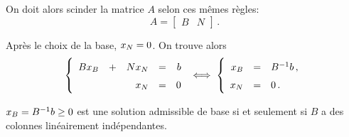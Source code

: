	On doit alors scinder la matrice $A$ selon ces mêmes règles:
	\[
	A
	=
	\begin{bmatrix}
		B & N
	\end{bmatrix}\,.
	\]

	Après le choix de la base, $x_N = 0$.
	On trouve alors
	\[
	\renewcommand{\arraystretch}{1.5}
	\left\{
	\begin{array}{rcrcr}
		B \xb & + & N \xn & = & b\\
		      &   &   \xn & = & 0
	\end{array}
	\right.
	\iff
	\left\{
	\begin{array}{rcl}
		\xb & = & B^{-1} b\,,\\
		\xn & = & 0\,.
	\end{array}
	\right.
	\]

	$x_B = B^{-1} b \ge 0$ est une solution admissible de base
	si et seulement si
	$B$ a des colonnes linéairement indépendantes.

